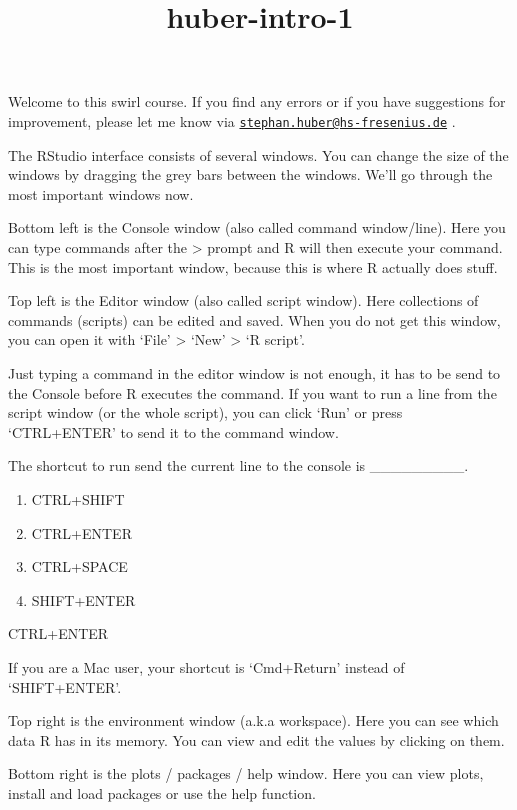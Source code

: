 \documentclass[
]{article}
\title{huber-intro-1}
\author{}
\date{\vspace{-2.5em}}
\providecommand{\tightlist}{%
  \setlength{\itemsep}{0pt}\setlength{\parskip}{0pt}}
\begin{document}
\maketitle

Welcome to this swirl course. If you find any errors or if you have
suggestions for improvement, please let me know via
\href{mailto:stephan.huber@hs-fresenius.de}{\nolinkurl{stephan.huber@hs-fresenius.de}}
.

The RStudio interface consists of several windows. You can change the
size of the windows by dragging the grey bars between the windows. We'll
go through the most important windows now.

Bottom left is the Console window (also called command window/line).
Here you can type commands after the \textgreater{} prompt and R will
then execute your command. This is the most important window, because
this is where R actually does stuff.

Top left is the Editor window (also called script window). Here
collections of commands (scripts) can be edited and saved. When you do
not get this window, you can open it with `File' \textgreater{} `New'
\textgreater{} `R script'.

Just typing a command in the editor window is not enough, it has to be
send to the Console before R executes the command. If you want to run a
line from the script window (or the whole script), you can click `Run'
or press `CTRL+ENTER' to send it to the command window.

The shortcut to run send the current line to the console is
\_\_\_\_\_\_\_\_\_.

\begin{enumerate}
\def\labelenumi{\arabic{enumi}.}
\tightlist
\item
  CTRL+SHIFT
\item
  CTRL+ENTER
\item
  CTRL+SPACE
\item
  SHIFT+ENTER
\end{enumerate}

CTRL+ENTER

If you are a Mac user, your shortcut is `Cmd+Return' instead of
`SHIFT+ENTER'.

Top right is the environment window (a.k.a workspace). Here you can see
which data R has in its memory. You can view and edit the values by
clicking on them.

Bottom right is the plots / packages / help window. Here you can view
plots, install and load packages or use the help function.
\end{document}
